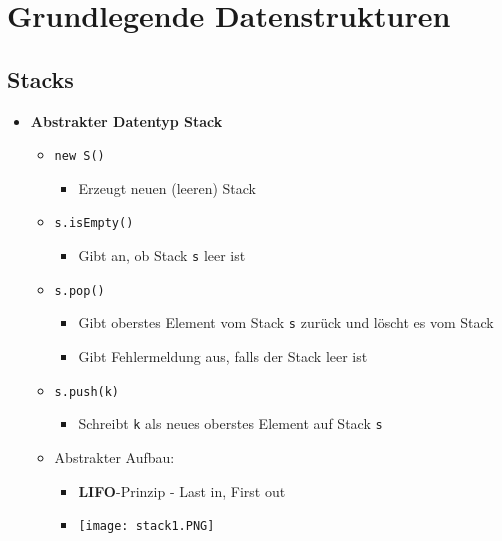 \section{Grundlegende Datenstrukturen}
\subsection{Stacks}
    \begin{itemize}
        \item \textbf{Abstrakter Datentyp Stack}
            \begin{itemize}
                \item \texttt{new S()}
                    \begin{itemize}
                        \item Erzeugt neuen (leeren) Stack
                    \end{itemize}
                \item \texttt{s.isEmpty()}
                    \begin{itemize}
                        \item Gibt an, ob Stack \texttt{s} leer ist
                    \end{itemize}
                \item \texttt{s.pop()}
                    \begin{itemize}
                        \item Gibt oberstes Element vom Stack \texttt{s} zurück und löscht es vom Stack 
                        \item Gibt Fehlermeldung aus, falls der Stack leer ist 
                    \end{itemize}
                \item \texttt{s.push(k)}
                    \begin{itemize}
                        \item Schreibt \texttt{k} als neues oberstes Element auf Stack \texttt{s}
                    \end{itemize}
                \item Abstrakter Aufbau:
                    \begin{itemize}
                        \item \textbf{LIFO}-Prinzip - Last in, First out 
                        \item[] \texttt{[image: stack1.PNG]}
                    \end{itemize}
            \end{itemize}


\end{itemize}
